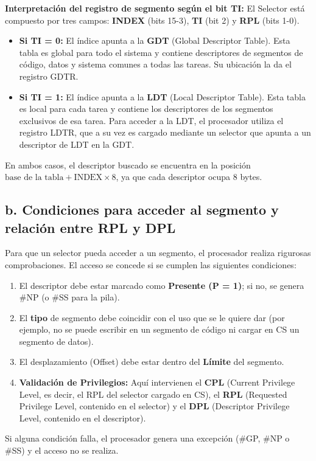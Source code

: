 \documentclass[RT]{UTNLSE}
\begin{document}
\textbf{Interpretación del registro de segmento según el bit TI:}
El Selector está compuesto por tres campos: \textbf{INDEX} (bits 15-3), \textbf{TI} (bit 2) y \textbf{RPL} (bits 1-0).
\begin{itemize}
    \item \textbf{Si TI = 0:} El índice apunta a la \textbf{GDT} (Global Descriptor Table). Esta tabla es global para todo el sistema y contiene descriptores de segmentos de código, datos y sistema comunes a todas las tareas. Su ubicación la da el registro GDTR.
    \item \textbf{Si TI = 1:} El índice apunta a la \textbf{LDT} (Local Descriptor Table). Esta tabla es local para cada tarea y contiene los descriptores de los segmentos exclusivos de esa tarea. Para acceder a la LDT, el procesador utiliza el registro LDTR, que a su vez es cargado mediante un selector que apunta a un descriptor de LDT en la GDT.
\end{itemize}
En ambos casos, el descriptor buscado se encuentra en la posición \(\text{base de la tabla} + \text{INDEX}\times 8\), ya que cada descriptor ocupa 8 bytes.

\subsection*{b. Condiciones para acceder al segmento y relación entre RPL y DPL}
Para que un selector pueda acceder a un segmento, el procesador realiza rigurosas comprobaciones. El acceso se concede si se cumplen las siguientes condiciones:
\begin{enumerate}
    \item El descriptor debe estar marcado como \textbf{Presente (P = 1)}; si no, se genera \#NP (o \#SS para la pila).
    \item El \textbf{tipo} de segmento debe coincidir con el uso que se le quiere dar (por ejemplo, no se puede escribir en un segmento de código ni cargar en CS un segmento de datos).
    \item El desplazamiento (Offset) debe estar dentro del \textbf{Límite} del segmento.
    \item \textbf{Validación de Privilegios:} Aquí intervienen el \textbf{CPL} (Current Privilege Level, es decir, el RPL del selector cargado en CS), el \textbf{RPL} (Requested Privilege Level, contenido en el selector) y el \textbf{DPL} (Descriptor Privilege Level, contenido en el descriptor).
\end{enumerate}
Si alguna condición falla, el procesador genera una excepción (\#GP, \#NP o \#SS) y el acceso no se realiza.
\end{document}
